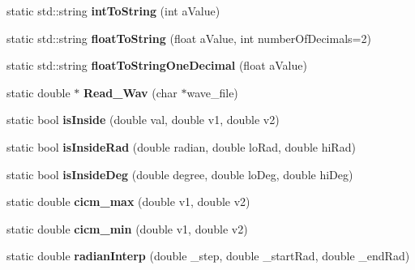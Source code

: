 \begin{DoxyCompactItemize}
\item 
\hypertarget{class_tools_af0150d5802d736aef8ba68fdf5f1d9cc}{static std\-::string {\bfseries int\-To\-String} (int a\-Value)}\label{class_tools_af0150d5802d736aef8ba68fdf5f1d9cc}

\item 
\hypertarget{class_tools_aecf6ed12f25991d66430b7ce187407f4}{static std\-::string {\bfseries float\-To\-String} (float a\-Value, int number\-Of\-Decimals=2)}\label{class_tools_aecf6ed12f25991d66430b7ce187407f4}

\item 
\hypertarget{class_tools_acd728a130524d341ea40c464ca2c3d38}{static std\-::string {\bfseries float\-To\-String\-One\-Decimal} (float a\-Value)}\label{class_tools_acd728a130524d341ea40c464ca2c3d38}

\item 
\hypertarget{class_tools_a14566babe75a08391f478a5ca2b90cdd}{static double $\ast$ {\bfseries Read\-\_\-\-Wav} (char $\ast$wave\-\_\-file)}\label{class_tools_a14566babe75a08391f478a5ca2b90cdd}

\item 
\hypertarget{class_tools_a970f64e0e36e05341c5b3bbd9a4a6f9b}{static bool {\bfseries is\-Inside} (double val, double v1, double v2)}\label{class_tools_a970f64e0e36e05341c5b3bbd9a4a6f9b}

\item 
\hypertarget{class_tools_a8b1187c89c4c85337493dfff72b21c40}{static bool {\bfseries is\-Inside\-Rad} (double radian, double lo\-Rad, double hi\-Rad)}\label{class_tools_a8b1187c89c4c85337493dfff72b21c40}

\item 
\hypertarget{class_tools_a0cbc8f8149968a530d8493dc892fb305}{static bool {\bfseries is\-Inside\-Deg} (double degree, double lo\-Deg, double hi\-Deg)}\label{class_tools_a0cbc8f8149968a530d8493dc892fb305}

\item 
\hypertarget{class_tools_a59cbf53b3ebcba49f0af3325767a2df4}{static double {\bfseries cicm\-\_\-max} (double v1, double v2)}\label{class_tools_a59cbf53b3ebcba49f0af3325767a2df4}

\item 
\hypertarget{class_tools_a6bcbe2f02c09559027552ffac0986768}{static double {\bfseries cicm\-\_\-min} (double v1, double v2)}\label{class_tools_a6bcbe2f02c09559027552ffac0986768}

\item 
\hypertarget{class_tools_a1e1e8e08b54127bfc706d865dd8a1d00}{static double {\bfseries radian\-Interp} (double \-\_\-step, double \-\_\-start\-Rad, double \-\_\-end\-Rad)}\label{class_tools_a1e1e8e08b54127bfc706d865dd8a1d00}


\end{DoxyCompactItemize}
